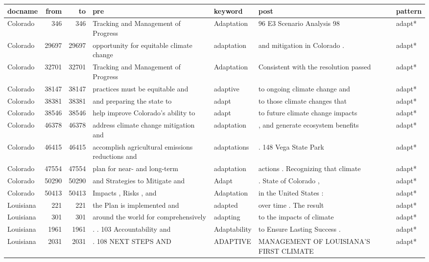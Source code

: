 \documentclass[
]{article}
\begin{document}
\begin{table}
\centering
\begin{tabular}[t]{l|r|r|l|l|l|l}
\hline
docname & from & to & pre & keyword & post & pattern\\
\hline
Colorado & 346 & 346 & Tracking and Management of Progress & Adaptation & 96 E3 Scenario Analysis 98 & adapt*\\
\hline
Colorado & 29697 & 29697 & opportunity for equitable climate change & adaptation & and mitigation in Colorado . & adapt*\\
\hline
Colorado & 32701 & 32701 & Tracking and Management of Progress & Adaptation & Consistent with the resolution passed & adapt*\\
\hline
Colorado & 38147 & 38147 & practices must be equitable and & adaptive & to ongoing climate change and & adapt*\\
\hline
Colorado & 38381 & 38381 & and preparing the state to & adapt & to those climate changes that & adapt*\\
\hline
Colorado & 38546 & 38546 & help improve Colorado’s ability to & adapt & to future climate change impacts & adapt*\\
\hline
Colorado & 46378 & 46378 & address climate change mitigation and & adaptation & , and generate ecosystem benefits & adapt*\\
\hline
Colorado & 46415 & 46415 & accomplish agricultural emissions reductions and & adaptations & . 148 Vega State Park & adapt*\\
\hline
Colorado & 47554 & 47554 & plan for near- and long-term & adaptation & actions . Recognizing that climate & adapt*\\
\hline
Colorado & 50290 & 50290 & and Strategies to Mitigate and & Adapt & . State of Colorado , & adapt*\\
\hline
Colorado & 50413 & 50413 & Impacts , Risks , and & Adaptation & in the United States : & adapt*\\
\hline
Louisiana & 221 & 221 & the Plan is implemented and & adapted & over time . The result & adapt*\\
\hline
Louisiana & 301 & 301 & around the world for comprehensively & adapting & to the impacts of climate & adapt*\\
\hline
Louisiana & 1961 & 1961 & . . 103 Accountability and & Adaptability & to Ensure Lasting Success . & adapt*\\
\hline
Louisiana & 2031 & 2031 & . 108 NEXT STEPS AND & ADAPTIVE & MANAGEMENT OF LOUISIANA’S FIRST CLIMATE & adapt*\\

\end{tabular}
\end{table}
\end{document}
